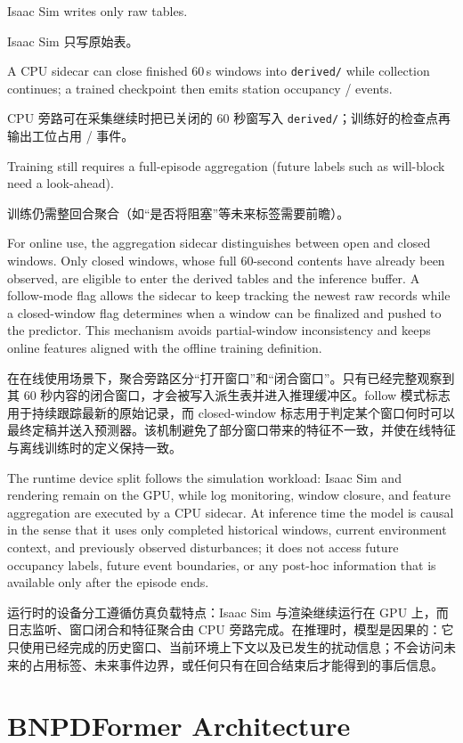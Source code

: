\documentclass[12pt,a4paper,oneside,scheme=plain]{ctexrep}
\newcommand{\bip}[2]{%
  \par #1\par
  \nobreak\vspace{0.12em}%
  {\small\color{black!62}#2}\par
  \vspace{0.62em}%
}
\begin{document}
\bip
{Isaac Sim writes only raw tables.}
{Isaac Sim 只写原始表。}

\bip
{A CPU sidecar can close finished 60\,s windows into \texttt{derived/} while collection continues; a trained checkpoint then emits station occupancy / events.}
{CPU 旁路可在采集继续时把已关闭的 60 秒窗写入 \texttt{derived/}；训练好的检查点再输出工位占用 / 事件。}

\bip
{Training still requires a full-episode aggregation (future labels such as will-block need a look-ahead).}
{训练仍需整回合聚合（如“是否将阻塞”等未来标签需要前瞻）。}


\bip
{For online use, the aggregation sidecar distinguishes between open and closed windows. Only closed windows, whose full 60-second contents have already been observed, are eligible to enter the derived tables and the inference buffer. A follow-mode flag allows the sidecar to keep tracking the newest raw records while a closed-window flag determines when a window can be finalized and pushed to the predictor. This mechanism avoids partial-window inconsistency and keeps online features aligned with the offline training definition.}
{在在线使用场景下，聚合旁路区分“打开窗口”和“闭合窗口”。只有已经完整观察到其 60 秒内容的闭合窗口，才会被写入派生表并进入推理缓冲区。follow 模式标志用于持续跟踪最新的原始记录，而 closed-window 标志用于判定某个窗口何时可以最终定稿并送入预测器。该机制避免了部分窗口带来的特征不一致，并使在线特征与离线训练时的定义保持一致。}

\bip
{The runtime device split follows the simulation workload: Isaac Sim and rendering remain on the GPU, while log monitoring, window closure, and feature aggregation are executed by a CPU sidecar. At inference time the model is causal in the sense that it uses only completed historical windows, current environment context, and previously observed disturbances; it does not access future occupancy labels, future event boundaries, or any post-hoc information that is available only after the episode ends.}
{运行时的设备分工遵循仿真负载特点：Isaac Sim 与渲染继续运行在 GPU 上，而日志监听、窗口闭合和特征聚合由 CPU 旁路完成。在推理时，模型是因果的：它只使用已经完成的历史窗口、当前环境上下文以及已发生的扰动信息；不会访问未来的占用标签、未来事件边界，或任何只有在回合结束后才能得到的事后信息。}

\section[BNPDFormer Architecture / BNPDFormer 结构]{BNPDFormer Architecture}
\label{sec:model}
\end{document}
